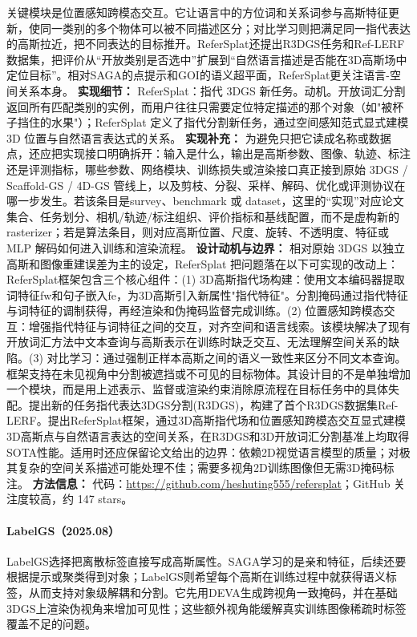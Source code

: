 关键模块是位置感知跨模态交互。它让语言中的方位词和关系词参与高斯特征更新，使同一类别的多个物体可以被不同描述区分；对比学习则把满足同一指代表达的高斯拉近，把不同表达的目标推开。ReferSplat还提出R3DGS任务和Ref-LERF数据集，把评价从“开放类别是否选中”扩展到“自然语言描述是否能在3D高斯场中定位目标”。相对SAGA的点提示和GOI的语义超平面，ReferSplat更关注语言-空间关系本身。
\textbf{实现细节：} ReferSplat：指代 3DGS 新任务。动机。开放词汇分割返回所有匹配类别的实例，而用户往往只需要定位特定描述的那个对象（如"被杯子挡住的水果"）；ReferSplat 定义了指代分割新任务，通过空间感知范式显式建模 3D 位置与自然语言表达式的关系。
\textbf{实现补充：} 为避免只把它读成名称或数据点，还应把实现接口明确拆开：输入是什么，输出是高斯参数、图像、轨迹、标注还是评测指标，哪些参数、网络模块、训练损失或渲染接口真正接到原始 3DGS / Scaffold-GS / 4D-GS 管线上，以及剪枝、分裂、采样、解码、优化或评测协议在哪一步发生。若该条目是survey、benchmark 或 dataset，这里的“实现”对应论文集合、任务划分、相机/轨迹/标注组织、评价指标和基线配置，而不是虚构新的 rasterizer；若是算法条目，则对应高斯位置、尺度、旋转、不透明度、特征或 MLP 解码如何进入训练和渲染流程。
\textbf{设计动机与边界：} 相对原始 3DGS 以独立高斯和图像重建误差为主的设定，ReferSplat 把问题落在以下可实现的改动上：ReferSplat框架包含三个核心组件：(1) 3D高斯指代场构建：使用文本编码器提取词特征fw和句子嵌入fe，为3D高斯引入新属性"指代特征"。分割掩码通过指代特征与词特征的调制获得，再经渲染和伪掩码监督完成训练。(2) 位置感知跨模态交互：增强指代特征与词特征之间的交互，对齐空间和语言线索。该模块解决了现有开放词汇方法中文本查询与高斯表示在训练时缺乏交互、无法理解空间关系的缺陷。(3) 对比学习：通过强制正样本高斯之间的语义一致性来区分不同文本查询。框架支持在未见视角中分割被遮挡或不可见的目标物体。其设计目的不是单独增加一个模块，而是用上述表示、监督或渲染约束消除原流程在目标任务中的具体失配。提出新的任务指代表达3DGS分割(R3DGS)，构建了首个R3DGS数据集Ref-LERF。提出ReferSplat框架，通过3D高斯指代场和位置感知跨模态交互显式建模3D高斯点与自然语言表达的空间关系，在R3DGS和3D开放词汇分割基准上均取得SOTA性能。适用时还应保留论文给出的边界：依赖2D视觉语言模型的质量；对极其复杂的空间关系描述可能处理不佳；需要多视角2D训练图像但无需3D掩码标注。
\textbf{方法信息：} 代码：\url{https://github.com/heshuting555/refersplat}；GitHub 关注度较高，约 147 stars。



\paragraph{LabelGS（2025.08）\cite{2508_19699}}
LabelGS选择把离散标签直接写成高斯属性。SAGA学习的是亲和特征，后续还要根据提示或聚类得到对象；LabelGS则希望每个高斯在训练过程中就获得语义标签，从而支持对象级解耦和分割。它先用DEVA生成跨视角一致掩码，并在基础3DGS上渲染伪视角来增加可见性；这些额外视角能缓解真实训练图像稀疏时标签覆盖不足的问题。

